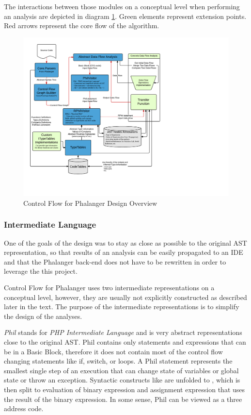     The interactions between those modules on a conceptual level 
    when performing an analysis are depicted in diagram \ref{overalldiagram}. 
    Green elements represent extension points. Red arrows represent the 
    core flow of the algorithm.

\begin{figure}[h]  
  \centering
    \includegraphics*[width=\textwidth,height=\textheight,keepaspectratio,viewport=0 55 532 590]{img/ControlFlowModules.pdf}  
    \caption{Control Flow for Phalanger Design Overview\label{overalldiagram}}
\end{figure}    

    \subsubsection*{Intermediate Language}
    One of the goals of the design was to stay as close as possible 
    to the original AST representation, so that results of an 
    analysis can be easily propagated to an IDE and that the 
    Phalanger back-end does not have to be rewritten in order to 
    leverage the this project.
    
    Control Flow for Phalanger uses two intermediate representations 
    on a conceptual level, however, they are usually not explicitly 
    constructed as described later in the text. The purpose of the 
    intermediate representations is to simplify the design of the 
    analyses.
    
    \emph{Phil} stands for \emph{PHP Intermediate Language} and is very abstract 
    representations close to the original AST. Phil contains 
    only statements and expressions that can be in a Basic Block, 
    therefore it does not contain most of the control flow 
    changing statements like if, switch, or loops. 
    A Phil statement represents the smallest single step 
    of an execution that can change state of variables 
    or global state or throw an exception. Syntactic 
    constructs like  are unfolded to 
    , which is then split to 
    evaluation of binary expression and assignment expression 
    that uses the result of the binary expression. In some sense, 
    Phil can be viewed as a three address code.
    
